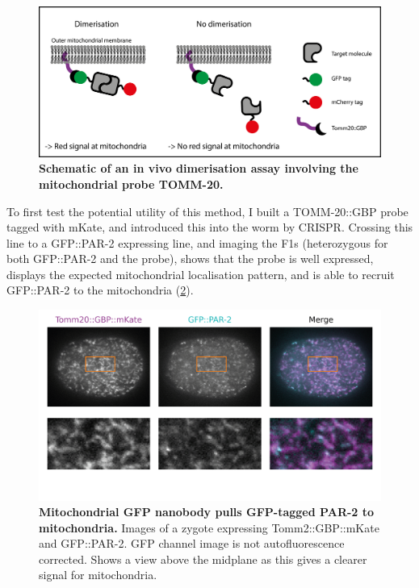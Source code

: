 \documentclass[12pt]{"article"}
\newcommand{\mycaption}[2]{\caption[#1]{\textbf{#1.} #2}}
\begin{document}
\begin{figure}
\includegraphics[scale=0.95]{tomm20_schematic}
\centering
\mycaption{Schematic of an in vivo dimerisation assay involving the mitochondrial probe TOMM-20}{
}
\label{fig:tomm20_schematic}
\end{figure}

To first test the potential utility of this method, I built a TOMM-20::GBP probe tagged with mKate, and introduced this into the worm by CRISPR. Crossing this line to a GFP::PAR-2 expressing line, and imaging the F1s (heterozygous for both GFP::PAR-2 and the probe), shows that the probe is well expressed, displays the expected mitochondrial localisation pattern, and is able to recruit GFP::PAR-2 to the mitochondria (\cref{fig:tomm20_merge}).\\

\begin{figure}
\includegraphics[scale=0.95]{tomm20_merge}
\centering
\mycaption{Mitochondrial GFP nanobody pulls GFP-tagged PAR-2 to mitochondria}{
Images of a zygote expressing Tomm2::GBP::mKate and GFP::PAR-2.
GFP channel image is not autofluorescence corrected. Shows a view above the midplane as this gives a clearer signal for mitochondria.
}
\label{fig:tomm20_merge}
\end{figure}
\end{document}
